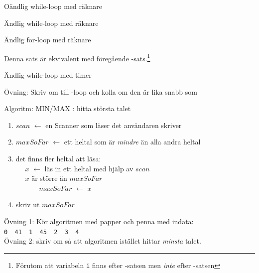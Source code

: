 \documentclass{lecturenotes}
\begin{document}
\begin{Slide}{Oändlig while-loop med räknare}

\end{Slide}

\begin{Slide}{Ändlig while-loop med räknare}

\end{Slide}


\begin{Slide}{Ändlig for-loop med räknare}

Denna sats är ekvivalent med föregående -sats.\footnote{\scriptsize Förutom att variabeln \texttt{i} finns efter -satsen men \textit{inte} efter -satsen }
\end{Slide}

\begin{Slide}{Ändlig while-loop med timer}

\scriptsize 
Övning: Skriv om till -loop och kolla om den är lika snabb som 
\end{Slide}

\begin{Slide}{Algoritm: MIN/MAX}
: hitta största talet \\ \vspace{1em}
\pause
{} 
\begin{enumerate}
\item $scan$ $\leftarrow$ en Scanner som läser det användaren skriver
\item $maxSoFar$ $\leftarrow$ ett heltal som är \textit{mindre} än alla andra heltal
\item  {} det finns fler heltal att läsa: \\
~~ $x$ $\leftarrow$ läs in ett heltal med hjälp av $scan$ \\
~~  $x$ är större än $maxSoFar$ \\
~~~~~~ $maxSoFar$ $\leftarrow$ $x$
\item skriv ut $maxSoFar$ 
\end{enumerate}
\vspace{1em} \scriptsize 
Övning 1: Kör algoritmen med papper och penna med indata: \texttt{0~~41~~1~~45~~2~~3~~4}\\ 
Övning 2: skriv om så att algoritmen istället hittar \textit{minsta} talet.
\end{Slide}
\end{document}
